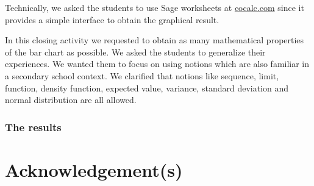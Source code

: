 \documentclass[]{interact}
\theoremstyle{plain}%
\theoremstyle{definition}
\theoremstyle{remark}
\begin{document}
Technically, we asked the students to use
Sage worksheets at \url{cocalc.com} since it provides a simple interface to obtain
the graphical result.

In this closing activity we requested to obtain as many mathematical properties of the bar chart
as possible. We asked the students to generalize their experiences. We wanted them to
focus on using notions which are also familiar in a secondary school context. We clarified
that notions like sequence, limit, function, density function, expected value, variance,
standard deviation and normal distribution are all allowed.

\subsubsection*{The results}

\section*{Acknowledgement(s)}

\begin{thebibliography}{99}


\end{thebibliography}
\end{document}
